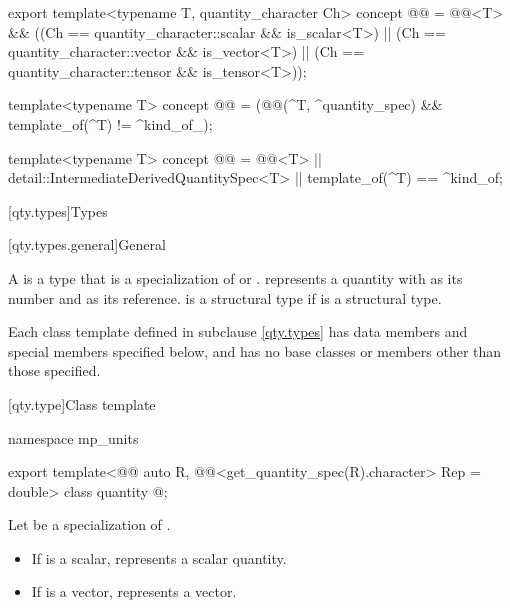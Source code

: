 \begin{itemdecl}
export template<typename T, quantity_character Ch>
concept @@ =
  @@<T> && ((Ch == quantity_character::scalar && is_scalar<T>) ||
                        (Ch == quantity_character::vector && is_vector<T>) ||
                        (Ch == quantity_character::tensor && is_tensor<T>));
\end{itemdecl}

\begin{itemdecl}
template<typename T>
concept @@ =
  (@@(^T, ^quantity_spec) && template_of(^T) != ^kind_of_);

template<typename T>
concept @@ =
  @@<T> ||
  detail::IntermediateDerivedQuantitySpec<T> ||
  template_of(^T) == ^kind_of;
\end{itemdecl}

[qty.types]{Types}

[qty.types.general]{General}

\pnum
A 
is a type 
that is a specialization of  or .
 represents a quantity
with  as its number
and  as its reference.
 is a structural type
if  is a structural type.

\pnum
Each class template defined in subclause \ref{qty.types}
has data members and special members specified below, and
has no base classes or members other than those specified.

[qty.type]{Class template }

\begin{codeblock}
namespace mp_units {

export template<@@ auto R,
                @@<get_quantity_spec(R).character> Rep = double>
class quantity { @\unspec@ };

}
\end{codeblock}

Let  be a specialization of .
\begin{itemize}
\item
If  is a scalar,
 represents a scalar quantity.
\item
If  is a vector,
 represents a vector.
\end{itemize}

